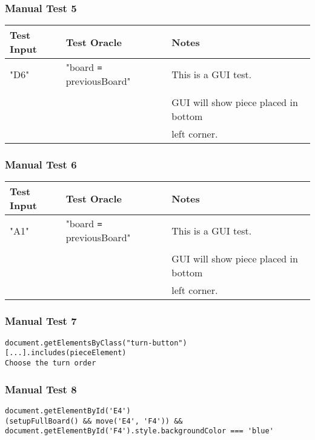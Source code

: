 \documentclass[11pt]{article}
\begin{document}
\subsubsection{Manual Test 5}
\label{sec:orgcc2fdc0}
\begin{center}
\begin{tabular}{|p{4.0cm}|p{6.0cm}|p{3.0cm}|}
Test Input & Test Oracle & Notes\\
\hline
"D6" & "board \texttt{=} previousBoard" & This is a GUI test.\\
 &  & \\
 &  & GUI will show piece placed in bottom\\
 &  & left corner.\\
\end{tabular}
\end{center}
\subsubsection{Manual Test 6}
\label{sec:orgf6e9b19}
\begin{center}
\begin{tabular}{|p{4.0cm}|p{6.0cm}|p{3.0cm}|}
Test Input & Test Oracle & Notes\\
\hline
"A1" & "board \texttt{=} previousBoard" & This is a GUI test.\\
 &  & \\
 &  & GUI will show piece placed in bottom\\
 &  & left corner.\\
\end{tabular}
\end{center}
\subsubsection{Manual Test 7}
\label{sec:org2c6ba93}
\lstset{language=js,label= ,caption= ,captionpos=b,numbers=none}
\begin{lstlisting}
document.getElementsByClass("turn-button")
[...].includes(pieceElement)
Choose the turn order
\end{lstlisting}
\subsubsection{Manual Test 8}
\label{sec:org76246c2}
\lstset{language=js,label= ,caption= ,captionpos=b,numbers=none}
\begin{lstlisting}
document.getElementById('E4')
(setupFullBoard() && move('E4', 'F4')) && document.getElementById('F4').style.backgroundColor === 'blue'
\end{lstlisting}
\end{document}
